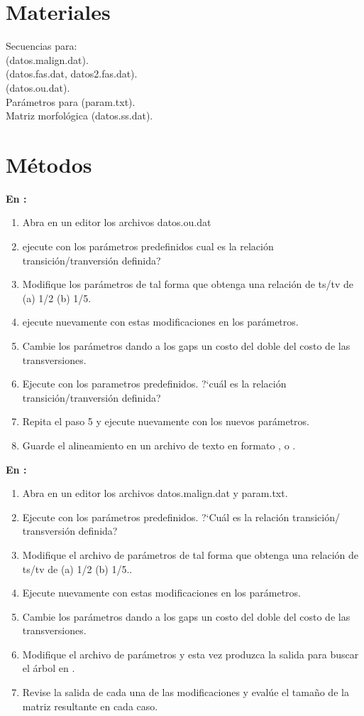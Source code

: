 \section{Materiales}
\noindent
Secuencias para:\\
 (datos.malign.dat).\\
 (datos.fas.dat, datos2.fas.dat).\\
 (datos.ou.dat).\\
Par\'ametros para  (param.txt).\\
Matriz morfol\'ogica (datos.ss.dat).
\section{M\'etodos}
\noindent
\textbf{En :}
\begin{enumerate}
\item Abra en un editor los archivos datos.ou.dat
\item   ejecute  con los par\'ametros predefinidos cual es la relaci\'on transici\'on/tranversi\'on definida?
\item   Modifique los par\'ametros de tal forma que obtenga una relaci\'on de ts/tv de (a) 1/2 (b) 1/5.
\item   ejecute nuevamente  con estas modificaciones en los par\'ametros.
\item   Cambie los par\'ametros dando a los gaps un costo del doble del costo de las transversiones.
\item  Ejecute  con los parametros predefinidos. ?`cu\'al es la relaci\'on transici\'on/tranversi\'on definida?
\item   Repita el paso 5 y ejecute nuevamente  con los nuevos par\'ametros.
\item    Guarde el alineamiento en un archivo de texto en formato ,  o .
\end{enumerate}


\textbf{En :}

\begin{enumerate}
\item Abra en un editor los archivos datos.malign.dat y param.txt.
\item Ejecute  con los par\'ametros predefinidos. ?`Cu\'al es la relaci\'on transici\'on/ transversi\'on definida?
\item Modifique el archivo de par\'ametros de tal forma que obtenga una relaci\'on de ts/tv de (a) 1/2 (b) 1/5..
\item Ejecute nuevamente  con estas modificaciones en los par\'ametros.
\item Cambie los par\'ametros dando a los gaps un costo del doble del costo de las transversiones.
\item Modifique el archivo de par\'ametros y esta vez produzca la salida para buscar el \'arbol en .
\item Revise la salida de cada una de las modificaciones y eval\'ue el tama\~no de la matriz resultante en cada caso.
\end{enumerate}

